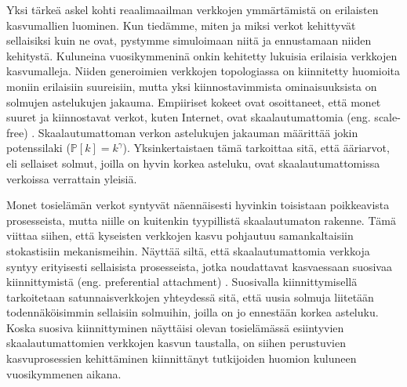 \documentclass[finnish, 12pt, a4paper, sci, utf8, pdfa]{aaltothesis}
\newcommand*{\prob}{\mathbb{P}}
\begin{document}
Yksi tärkeä askel kohti reaalimaailman verkkojen ymmärtämistä on erilaisten kasvumallien luominen. Kun tiedämme, miten ja miksi verkot kehittyvät sellaisiksi kuin ne ovat,
pystymme simuloimaan niitä ja ennustamaan niiden kehitystä. Kuluneina vuosikymmeninä onkin kehitetty lukuisia erilaisia verkkojen kasvumalleja. Niiden generoimien verkkojen
topologiassa on kiinnitetty huomioita moniin erilaisiin suureisiin, mutta yksi kiinnostavimmista ominaisuuksista on solmujen astelukujen jakauma. Empiiriset kokeet ovat osoittaneet, 
että monet suuret ja kiinnostavat verkot, kuten Internet, ovat skaalautumattomia (eng. scale-free) \cite{Clauset}. Skaalautumattoman verkon astelukujen jakauman määrittää jokin potenssilaki 
($ \prob \left[ k \right] = k^{\gamma} $). Yksinkertaistaen tämä tarkoittaa sitä, että ääriarvot, eli sellaiset solmut, joilla on hyvin korkea asteluku, ovat skaalautumattomissa verkoissa
verrattain yleisiä. \cite{Babarasi-kirja} 

Monet tosielämän verkot syntyvät näennäisesti hyvinkin toisistaan poikkeavista prosesseista, mutta niille on kuitenkin tyypillistä skaalautumaton rakenne. Tämä viittaa siihen,
että kyseisten verkkojen kasvu pohjautuu samankaltaisiin stokastisiin mekanismeihin. Näyttää siltä, että skaalautumattomia verkkoja syntyy erityisesti sellaisista prosesseista, 
jotka noudattavat kasvaessaan suosivaa kiinnittymistä (eng. preferential attachment) \cite{Babarasi}. Suosivalla kiinnittymisellä tarkoitetaan satunnaisverkkojen yhteydessä sitä, että uusia 
solmuja liitetään todennäköisimmin sellaisiin solmuihin, joilla on jo ennestään korkea asteluku. Koska suosiva kiinnittyminen näyttäisi olevan tosielämässä esiintyvien skaalautumattomien
verkkojen kasvun taustalla, on siihen perustuvien kasvuprosessien kehittäminen kiinnittänyt tutkijoiden huomion kuluneen vuosikymmenen aikana. 
\end{document}
